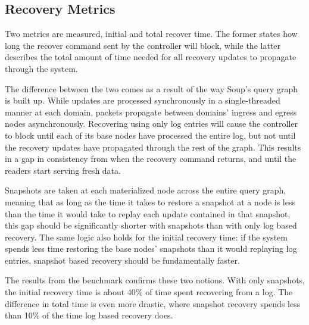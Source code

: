 \documentclass[b5paper]{report}
\begin{document}
\subsection{Recovery Metrics}
Two metrics are measured, initial and total recover time. The former states how
long the recover command sent by the controller will block, while the latter
describes the total amount of time needed for all recovery updates to propagate
through the system.

The difference between the two comes as a result of the way Soup's query graph
is built up. While updates are processed synchronously in a single-threaded
manner at each domain, packets propagate between domains' ingress and egress
nodes asynchronously. Recovering using only log entries will cause the
controller to block until each of its base nodes have processed the entire log,
but not until the recovery updates have propagated through the rest of the graph.
This results in a gap in consistency from when the recovery command returns, and
until the readers start serving fresh data.

Snapshots are taken at each materialized node across the entire query
graph, meaning that as long as the time it takes to restore a snapshot at a node
is less than the time it would take to replay each update contained in that
snapshot, this gap should be significantly shorter with snapshots than with only
log based recovery. The same logic also holds for the initial recovery time: if
the system spends less time restoring the base nodes' snapshots than it would
replaying log entries, snapshot based recovery should be fundamentally faster.

The results from the benchmark confirms these two notions. With only snapshots,
the initial recovery time is about 40\% of time spent recovering from a log.
The difference in total time is even more drastic, where snapshot recovery
spends less than 10\% of the time log based recovery does.
\end{document}
